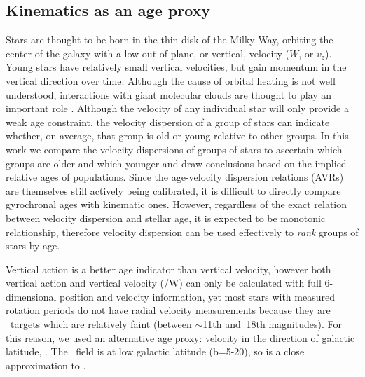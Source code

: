\subsection{Kinematics as an age proxy}

Stars are thought to be born in the thin disk of the Milky Way, orbiting the
center of the galaxy with a low out-of-plane, or vertical, velocity ($W$, or
$v_z$).
Young stars have relatively small vertical velocities, but gain momentum in
the vertical direction over time.
Although the cause of orbital heating is not well understood, interactions
with giant molecular clouds are thought to play an important role
.
Although the velocity of any individual star will only provide a weak age
constraint, the velocity dispersion of a group of stars can indicate whether,
on average, that group is old or young relative to other groups.
In this work we compare the velocity dispersions of groups of stars to
ascertain which groups are older and which younger and draw conclusions based
on the implied relative ages of populations.
Since the age-velocity dispersion relations (AVRs) are themselves still
actively being calibrated, it is difficult to directly compare gyrochronal
ages with kinematic ones.
However, regardless of the exact relation between velocity dispersion and
stellar age, it is expected to be monotonic relationship, therefore velocity
dispersion can be used effectively to {\it rank} groups of stars by age.

Vertical action is a better age indicator than vertical velocity, however both
vertical action and vertical velocity (\vz/W) can only be calculated with full
6-dimensional position and velocity information, yet most stars with measured
rotation periods do not have radial velocity measurements because they are
\kepler\ targets which are relatively faint (between $\sim$11th and $~$18th
magnitudes).
For this reason, we used an alternative age proxy: velocity in the direction
of galactic latitude, \vb.
The \kepler\ field is at low galactic latitude (b=5-20\degrees), so \vb is a
close approximation to \vz.

